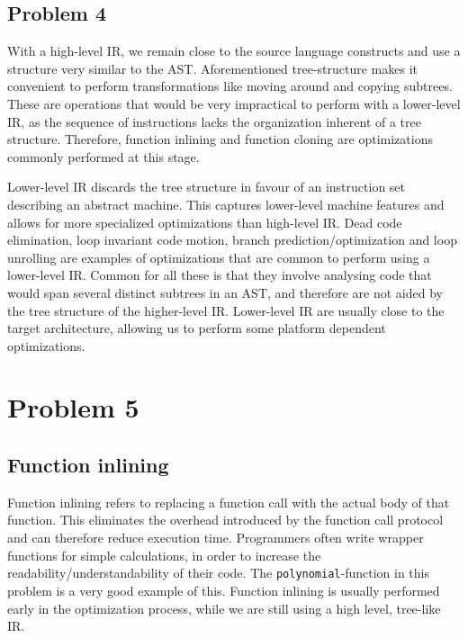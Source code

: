 \documentclass[twoside]{article}
\begin{document}
\begin{multicols}{2}
    \section{Problem 4}

    With a high-level IR, we remain close to the source language constructs and use a structure very similar to the AST. 
    Aforementioned tree-structure makes it convenient to perform transformations like moving around and copying subtrees.
    These are operations that would be very impractical to perform with a lower-level IR, as the sequence of instructions lacks the organization inherent of a tree structure.
    Therefore, function inlining and function cloning are optimizations commonly performed at this stage.

    Lower-level IR discards the tree structure in favour of an instruction set describing an abstract machine.
    This captures lower-level machine features and allows for more specialized optimizations than high-level IR.
    Dead code elimination, loop invariant code motion, branch prediction/optimization and loop unrolling are examples of optimizations that are common to perform using a lower-level IR.
    Common for all these is that they involve analysing code that would span several distinct subtrees in an AST, and therefore are not aided by the tree structure of the higher-level IR.
    Lower-level IR are usually close to the target architecture, allowing us to perform some platform dependent optimizations.

\end{multicols}
\newpage

    \section{Problem 5}

    \subsection{Function inlining}

    Function inlining refers to replacing a function call with the actual body of that function. 
    This eliminates the overhead introduced by the function call protocol and can therefore reduce execution time.
    Programmers often write wrapper functions for simple calculations, in order to increase the readability/understandability of their code.
    The \texttt{polynomial}-function in this problem is a very good example of this.
    Function inlining is usually performed early in the optimization process, while we are still using a high level, tree-like IR.
\end{document}
